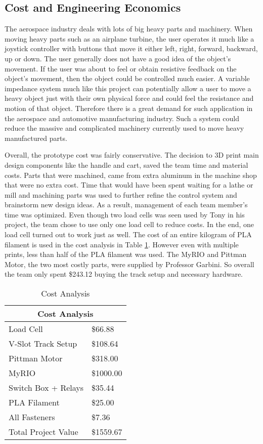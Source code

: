 \subsection*{Cost and Engineering Economics}
The aerospace industry deals with lots of big heavy parts and machinery. When moving heavy parts such as an airplane turbine, the user operates it much like a joystick controller with buttons that move it either left, right, forward, backward, up or down. The user generally does not have a good idea of the object's movement. If the user was about to feel or obtain resistive feedback on the object's movement, then the object could be controlled much easier. A variable impedance system much like this project can potentially allow a user to move a heavy object just with their own physical force and could feel the resistance and motion of that object. Therefore there is a great demand for such application in the aerospace and automotive manufacturing industry. Such a system could reduce the massive and complicated machinery currently used to move heavy manufactured parts.

Overall, the prototype cost was fairly conservative. The decision to 3D print main design components like the handle and cart, saved the team time and material costs. Parts that were machined, came from extra aluminum in the machine shop that were no extra cost. Time that would have been spent waiting for a lathe or mill and machining parts was used to further refine the control system and brainstorm new design ideas. As a result, management of each team member's time was optimized. Even though two load cells was seen used by Tony in his project, the team chose to use only one load cell to reduce costs. In the end, one load cell turned out to work just as well. The cost of an entire kilogram of PLA filament is used in the cost analysis in Table \ref{cost_analysis}. However even with multiple prints, less than half of the PLA filament was used. The MyRIO and Pittman Motor, the two most costly parts, were supplied by Professor Garbini. So overall the team only spent \$243.12 buying the track setup and necessary hardware.
\begin{table}[H]
	\caption{Cost Analysis}
	\centering
	\label{cost_analysis}
	\begin{tabular}{|l|l|}
		\hline
		\multicolumn{2}{|c|}{Cost Analysis} \\ \hline	\hline
		Load Cell             & \$66.88     \\ \hline
		V-Slot Track Setup    & \$108.64    \\ \hline
		Pittman Motor         & \$318.00    \\ \hline
		MyRIO                 & \$1000.00   \\ \hline
		Switch Box + Relays   & \$35.44     \\ \hline
		PLA Filament          & \$25.00     \\ \hline
		All Fasteners         & \$7.36      \\ \hline	\hline
		Total Project Value   & \$1559.67   \\ \hline
	\end{tabular}
\end{table}